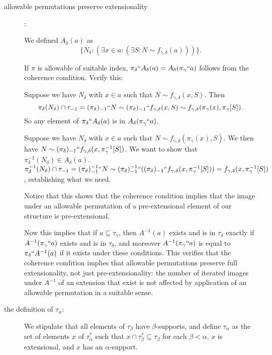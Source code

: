 \documentclass[112pt]{article}
\begin{document}
\begin{description}
\item[allowable permutations preserve extensionality]:

  We defined $A_\delta(a)$ as $$\{N_\delta:(\exists x \in a:(\exists S:N \sim f_{\gamma,\delta}(a)))\}.$$

If $\pi$ is allowable of suitable index, $\pi_\delta``A_\delta(a)= A_\delta(\pi_\gamma``a)$ follows from the coherence condition.  Verify this:

Suppose we have $N_\delta$ with $x \in a$ such that $N \sim f_{\gamma,\delta}(x,S)$.  Then $$\pi_\delta(N_\delta)  \cap \tau_{-1} = (\pi_\delta)_{-1}``N \sim (\pi_\delta)_{-1}``f_{\gamma,\delta}(x,S) \sim f_{\gamma,\delta}(\pi_\gamma(x),\pi_\gamma[S]).$$  So any element of $\pi_\delta``A_\delta(a)$ is in $A_\delta(\pi_\gamma``a)$.

Suppose we have $N_\delta$ with $x \in a$ such that $N \sim f_{\gamma,\delta}(\pi_\gamma(x),S)$.  We then have $N \sim (\pi_\delta)_{-1}``f_{\gamma,\delta}(x,\pi_\gamma^{-1}[S])$.  We want to show that $\pi_\delta^{-1}(N_\delta) \in A_\delta(a)$.  $\pi_\delta^{-1}(N_\delta) \cap \tau_{-1} = (\pi_\delta)_{-1}^{-1}``N \sim 
(\pi_\delta)_{-1}^{-1}``((\pi_\delta)_{-1}``f_{\gamma,\delta}(x,\pi_\gamma^{-1}[S])) = f_{\gamma,\delta}(x,\pi_\gamma^{-1}[S])$, establishing what we need.

Notice that this shows that the coherence condition implies that the image under an allowable permutation of a pre-extensional element of our structure is pre-extensional.

Now this implies that if $a \subseteq \tau_\gamma$, then $A^{-1}(a)$ exists and is in $\tau_\delta$ exactly if $A^{-1}(\pi_\gamma``a)$ exists and is in $\tau_\delta$, and moreover $A^{-1}(\pi_\gamma``a)$ is equal to $\pi_\delta``A^{-1}(a)$ if it exists under these conditions.  This verifies that the coherence condition implies that allowable permutations preserve full extensionality, not just pre-extensionality:  the number of iterated images under $A^{-1}$ of an extension that exist is not affected by application of an allowable permutation in a suitable sense.



\item[the definition of $\tau_\alpha$:]  We stipulate that all elements of $\tau_\beta$ have $\beta$-supports, and define $\tau_\alpha$ as the set of elements $x$ of $\tau^*_\alpha$ such that
$x \cap \tau^*_{\beta} \subseteq \tau_\beta$ for each $\beta<\alpha$, $x$ is extensional, and $x$ has an $\alpha$-support.


\end{description}
\end{document}
